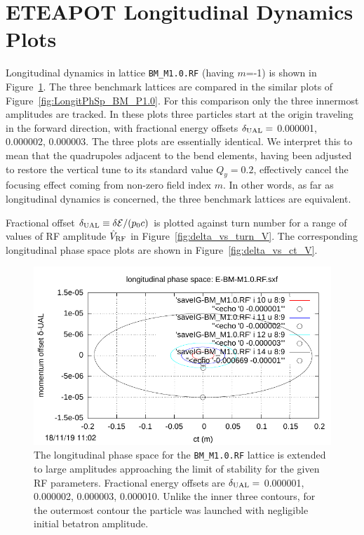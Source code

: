 \documentclass[]{article}
\begin{document}
\section{ETEAPOT Longitudinal Dynamics Plots}
Longitudinal dynamics in lattice {\tt BM\_M1.0.RF} (having $m$=-1) is
shown in Figure~\ref{fig:LongitPhSp_BM_M1.0}.
The three
benchmark lattices are compared in the similar plots of
Figure~\ref{fig:LongitPhSp_BM_P1.0}. For this comparison 
only the three innermost amplitudes
are tracked. In these plots three particles start at the origin
traveling in the forward direction, with fractional
energy offsets $\delta_{\rm UAL}=$ 0.000001, 0.000002, 0.000003.
The three plots are essentially identical. We interpret this
to mean that the quadrupoles adjacent to the bend elements,
having been adjusted to restore the vertical tune to its
standard value $Q_y=0.2$, effectively cancel the
focusing effect coming from non-zero field index $m$.
In other words, as far as longitudinal dynamics is concerned,
the three benchmark lattices are equivalent.

Fractional offset 
$\delta_{\rm UAL}\equiv\delta{\mathcal{E}}/(p_0c)$ is
plotted against turn number for a range of 
values of RF amplitude $\hat V_{\rm RF}$ in 
Figure~\ref{fig:delta_vs_turn_V}.  The corresponding longitudinal
phase space plots are shown in Figure~\ref{fig:delta_vs_ct_V}.
%
\begin{figure}[h]
\centering
\includegraphics[scale=1.2]{pdf/BM-III_Figure3.pdf}
\caption{\label{fig:LongitPhSp_BM_M1.0}The longitudinal phase space for 
the {\tt BM\_M1.0.RF} lattice is extended to large amplitudes approaching
the limit of stability for the given RF parameters.
Fractional energy offsets are 
$\delta_{\rm UAL}=$ 0.000001, 0.000002, 0.000003, 0.000010. Unlike
the inner three contours, for the outermost contour the particle was 
launched with negligible initial betatron amplitude. 
}
\end{figure}
%
\end{document}
